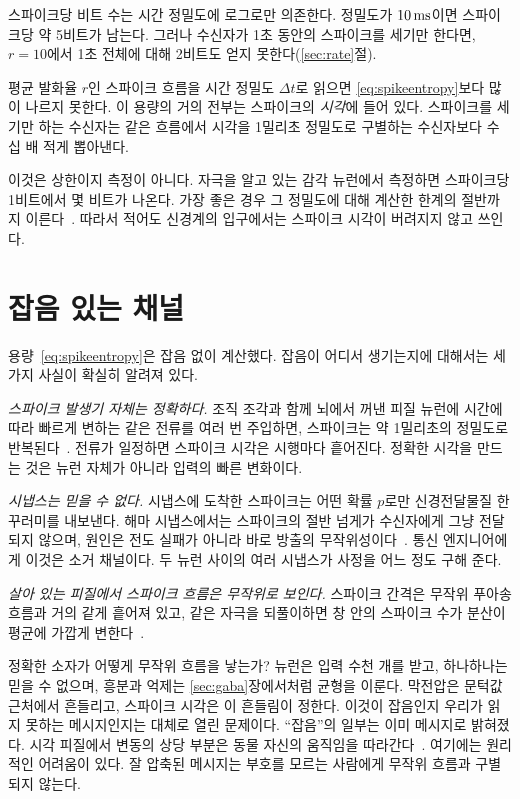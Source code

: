 스파이크당 비트 수는 시간 정밀도에 로그로만 의존한다. 정밀도가 $10\,\text{ms}$이면 스파이크당 약 5비트가 남는다. 그러나 수신자가 1초 동안의 스파이크를 세기만 한다면, $r=10$에서 1초 전체에 대해 2비트도 얻지 못한다(\ref{sec:rate}절).

\begin{keyblock}
\begin{proposition}
\label{prop:capacity}
평균 발화율 $r$인 스파이크 흐름을 시간 정밀도 $\Delta t$로 읽으면 \eqref{eq:spikeentropy}보다 많이 나르지 못한다. 이 용량의 거의 전부는 스파이크의 \emph{시각}에 들어 있다. 스파이크를 세기만 하는 수신자는 같은 흐름에서 시각을 1밀리초 정밀도로 구별하는 수신자보다 수십 배 적게 뽑아낸다.
\end{proposition}
\end{keyblock}

이것은 상한이지 측정이 아니다. 자극을 알고 있는 감각 뉴런에서 측정하면 스파이크당 1비트에서 몇 비트가 나온다. 가장 좋은 경우 그 정밀도에 대해 계산한 한계의 절반까지 이른다~\cite{Rieke1997}. 따라서 적어도 신경계의 입구에서는 스파이크 시각이 버려지지 않고 쓰인다.

\section{잡음 있는 채널}

용량~\eqref{eq:spikeentropy}은 잡음 없이 계산했다. 잡음이 어디서 생기는지에 대해서는 세 가지 사실이 확실히 알려져 있다.

\emph{스파이크 발생기 자체는 정확하다.} 조직 조각과 함께 뇌에서 꺼낸 피질 뉴런에 시간에 따라 빠르게 변하는 같은 전류를 여러 번 주입하면, 스파이크는 약 1밀리초의 정밀도로 반복된다~\cite{Mainen1995}. 전류가 일정하면 스파이크 시각은 시행마다 흩어진다. 정확한 시각을 만드는 것은 뉴런 자체가 아니라 입력의 빠른 변화이다.

\emph{시냅스는 믿을 수 없다.}  시냅스에 도착한 스파이크는 어떤 확률 $p$로만 신경전달물질 한 꾸러미를 내보낸다. 해마 시냅스에서는 스파이크의 절반 넘게가 수신자에게 그냥 전달되지 않으며, 원인은 전도 실패가 아니라 바로 방출의 무작위성이다~\cite{AllenStevens1994}. 통신 엔지니어에게 이것은 소거 채널이다. 두 뉴런 사이의 여러 시냅스가 사정을 어느 정도 구해 준다.

\emph{살아 있는 피질에서 스파이크 흐름은 무작위로 보인다.} 스파이크 간격은 무작위 푸아송 흐름과 거의 같게 흩어져 있고, 같은 자극을 되풀이하면 창 안의 스파이크 수가 분산이 평균에 가깝게 변한다~\cite{Softky1993}.

정확한 소자가 어떻게 무작위 흐름을 낳는가? 뉴런은 입력 수천 개를 받고, 하나하나는 믿을 수 없으며, 흥분과 억제는 \ref{sec:gaba}장에서처럼 균형을 이룬다. 막전압은 문턱값 근처에서 흔들리고, 스파이크 시각은 이 흔들림이 정한다. 이것이 잡음인지 우리가 읽지 못하는 메시지인지는 대체로 열린 문제이다. “잡음”의 일부는 이미 메시지로 밝혀졌다. 시각 피질에서 변동의 상당 부분은 동물 자신의 움직임을 따라간다~\cite{Stringer2019}. 여기에는 원리적인 어려움이 있다. 잘 압축된 메시지는 부호를 모르는 사람에게 무작위 흐름과 구별되지 않는다.

